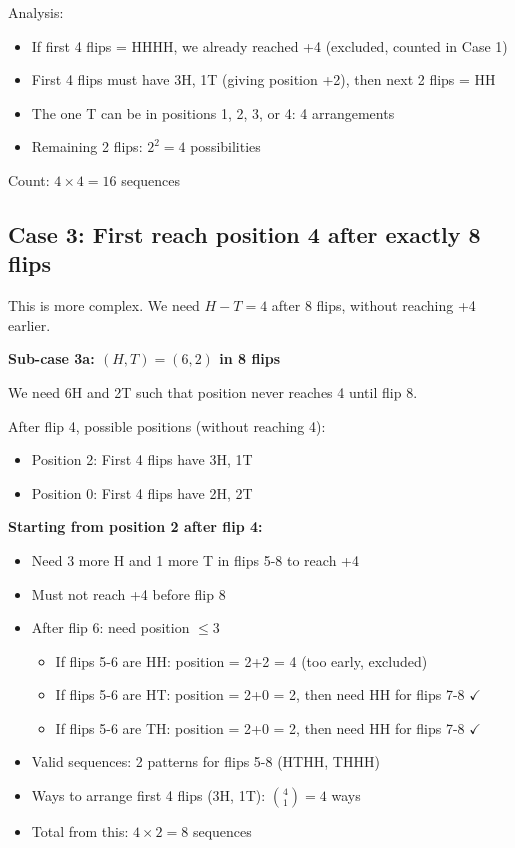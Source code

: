 \documentclass[]{article}
\begin{document}
Analysis:
\begin{itemize}
    \item If first 4 flips = HHHH, we already reached +4 (excluded, counted in Case 1)
    \item First 4 flips must have 3H, 1T (giving position +2), then next 2 flips = HH
    \item The one T can be in positions 1, 2, 3, or 4: 4 arrangements
    \item Remaining 2 flips: $2^2 = 4$ possibilities
\end{itemize}

Count: $4 \times 4 = 16$ sequences

\subsection*{Case 3: First reach position 4 after exactly 8 flips}

This is more complex. We need $H - T = 4$ after 8 flips, without reaching +4 earlier.

\textbf{Sub-case 3a: $(H,T) = (6,2)$ in 8 flips}

We need 6H and 2T such that position never reaches 4 until flip 8.

After flip 4, possible positions (without reaching 4):
\begin{itemize}
    \item Position 2: First 4 flips have 3H, 1T
    \item Position 0: First 4 flips have 2H, 2T
\end{itemize}

\textbf{Starting from position 2 after flip 4:}
\begin{itemize}
    \item Need 3 more H and 1 more T in flips 5-8 to reach +4
    \item Must not reach +4 before flip 8
    \item After flip 6: need position $\leq 3$
    \begin{itemize}
        \item If flips 5-6 are HH: position = 2+2 = 4 (too early, excluded)
        \item If flips 5-6 are HT: position = 2+0 = 2, then need HH for flips 7-8 $\checkmark$
        \item If flips 5-6 are TH: position = 2+0 = 2, then need HH for flips 7-8 $\checkmark$
    \end{itemize}
    \item Valid sequences: 2 patterns for flips 5-8 (HTHH, THHH)
    \item Ways to arrange first 4 flips (3H, 1T): $\binom{4}{1} = 4$ ways
    \item Total from this: $4 \times 2 = 8$ sequences
\end{itemize}
\end{document}
